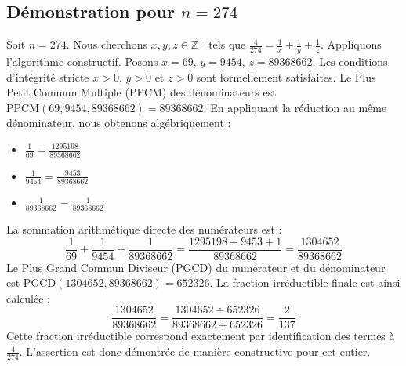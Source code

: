 \documentclass[11pt,a4paper]{article}
\begin{document}
\subsection{Démonstration pour $n = 274$}
Soit $n = 274$. Nous cherchons $x, y, z \in \mathbb{Z}^{+}$ tels que $\frac{4}{274} = \frac{1}{x} + \frac{1}{y} + \frac{1}{z}$.
Appliquons l'algorithme constructif. Posons $x = 69$, $y = 9454$, $z = 89368662$.
Les conditions d'intégrité stricte $x > 0$, $y > 0$ et $z > 0$ sont formellement satisfaites.
Le Plus Petit Commun Multiple (PPCM) des dénominateurs est $\text{PPCM}(69, 9454, 89368662) = 89368662$.
En appliquant la réduction au même dénominateur, nous obtenons algébriquement :
\begin{itemize}
    \item $\frac{1}{69} = \frac{1295198}{89368662}$
    \item $\frac{1}{9454} = \frac{9453}{89368662}$
    \item $\frac{1}{89368662} = \frac{1}{89368662}$
\end{itemize}
La sommation arithmétique directe des numérateurs est :
$$ \frac{1}{69} + \frac{1}{9454} + \frac{1}{89368662} = \frac{1295198 + 9453 + 1}{89368662} = \frac{1304652}{89368662} $$
Le Plus Grand Commun Diviseur (PGCD) du numérateur et du dénominateur est $\text{PGCD}(1304652, 89368662) = 652326$.
La fraction irréductible finale est ainsi calculée :
$$ \frac{1304652}{89368662} = \frac{1304652 \div 652326}{89368662 \div 652326} = \frac{2}{137} $$
Cette fraction irréductible correspond exactement par identification des termes à $\frac{4}{274}$. L'assertion est donc démontrée de manière constructive pour cet entier.
\end{document}
